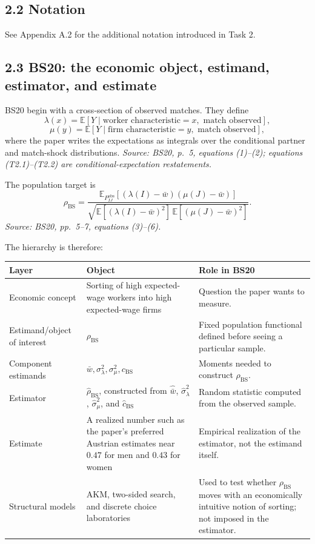 \documentclass[11pt]{article}
\begin{document}
\subsection{2.2 Notation}

See Appendix A.2 for the additional notation introduced in Task 2.

\subsection{2.3 BS20: the economic object, estimand, estimator, and estimate}

BS20 begin with a cross-section of observed matches.  They define
\[
\lambda(x)
=
\mathbb E[Y\mid \text{worker characteristic}=x,\text{ match observed}],
\tag{T2.1}
\]
\[
\mu(y)
=
\mathbb E[Y\mid \text{firm characteristic}=y,\text{ match observed}],
\tag{T2.2}
\]
where the paper writes the expectations as integrals over the conditional
partner and match-shock distributions.  \textit{Source: BS20, p.\ 5,
equations (1)--(2); equations (T2.1)--(T2.2) are conditional-expectation
restatements.}

The population target is
\[
\rho_{\mathrm{BS}}
=
\frac{
\mathbb E_{P^{\mathrm{obs}}_{IJ}}
[(\lambda(I)-\bar w)(\mu(J)-\bar w)]
}{
\sqrt{
\mathbb E[(\lambda(I)-\bar w)^2]\,
\mathbb E[(\mu(J)-\bar w)^2]
}
}.
\tag{T2.3}
\]
\textit{Source: BS20, pp.\ 5--7, equations (3)--(6).}

The hierarchy is therefore:

\begin{longtable}{p{}p{}p{}}
\textbf{Layer} & \textbf{Object} & \textbf{Role in BS20} \\
\hline
Economic concept & Sorting of high expected-wage workers into high
expected-wage firms & Question the paper wants to measure. \\
Estimand/object of interest & \(\rho_{\mathrm{BS}}\) & Fixed population
functional defined before seeing a particular sample. \\
Component estimands & \(\bar w,\sigma_\lambda^2,\sigma_\mu^2,c_{\mathrm{BS}}\)
& Moments needed to construct \(\rho_{\mathrm{BS}}\). \\
Estimator & \(\widehat\rho_{\mathrm{BS}}\), constructed from
\(\widehat{\bar w}\), \(\widehat\sigma_\lambda^2\),
\(\widehat\sigma_\mu^2\), and \(\widehat c_{\mathrm{BS}}\) & Random statistic
computed from the observed sample. \\
Estimate & A realized number such as the paper's preferred Austrian estimates
near \(0.47\) for men and \(0.43\) for women & Empirical realization of the
estimator, not the estimand itself. \\
Structural models & AKM, two-sided search, and discrete choice laboratories &
Used to test whether \(\rho_{\mathrm{BS}}\) moves with an economically intuitive
notion of sorting; not imposed in the estimator. \\
\end{longtable}
\end{document}
